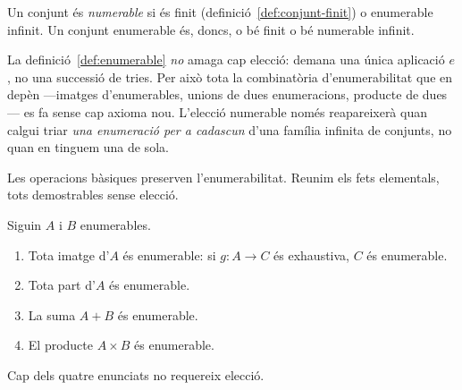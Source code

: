 \begin{definicio}\label{def:numerable}
Un conjunt és \emph{numerable} si és finit
(definició~\ref{def:conjunt-finit}) o enumerable infinit. Un conjunt
enumerable és, doncs, o bé finit o bé numerable infinit.
\end{definicio}

\begin{observacio}\label{obs:enumerable-sense-eleccio}
La definició~\ref{def:enumerable} \emph{no} amaga cap elecció: demana una
única aplicació \(e\), no una successió de tries. Per això tota la
combinatòria d'enumerabilitat que en depèn ---imatges d'enumerables,
unions de dues enumeracions, producte de dues--- es fa sense cap axioma
nou. L'elecció numerable només reapareixerà quan calgui triar \emph{una
enumeració per a cadascun} d'una família infinita de conjunts, no quan en
tinguem una de sola.
\end{observacio}

Les operacions bàsiques preserven l'enumerabilitat. Reunim els fets
elementals, tots demostrables sense elecció.

\begin{proposicio}\label{prop:estabilitat-enumerable}
Siguin \(A\) i \(B\) enumerables.
\begin{enumerate}
\item Tota imatge d'\(A\) és enumerable: si \(g\colon A\to C\) és
exhaustiva, \(C\) és enumerable.
\item Tota part d'\(A\) és enumerable.
\item La suma \(A+B\) és enumerable.
\item El producte \(A\times B\) és enumerable.
\end{enumerate}
Cap dels quatre enunciats no requereix elecció.
\end{proposicio}

